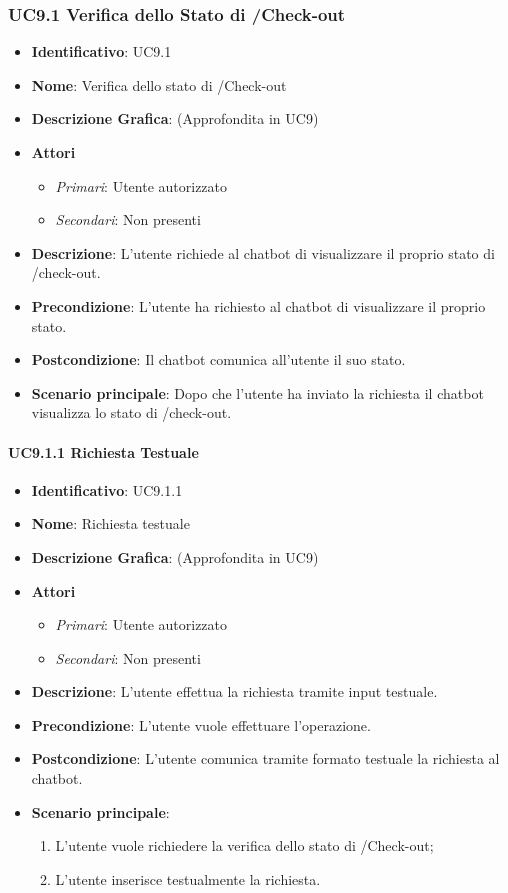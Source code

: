 \subsubsection{UC9.1 Verifica dello Stato di /Check-out}
\begin{itemize}
	\item \textbf{Identificativo}: UC9.1
	\item \textbf{Nome}: Verifica dello stato di /Check-out
	\item \textbf{Descrizione Grafica}: (Approfondita in UC9)
	\item \textbf{Attori}
	\begin{itemize}
		\item \textit{Primari}: Utente autorizzato
		\item \textit{Secondari}: Non presenti
	\end{itemize}
	\item \textbf{Descrizione}: L'utente richiede al chatbot di visualizzare il proprio stato di /check-out.
	\item \textbf{Precondizione}: L'utente ha richiesto al chatbot di visualizzare il proprio stato.
	\item \textbf{Postcondizione}: Il chatbot comunica all'utente il suo stato.
	\item \textbf{Scenario principale}: Dopo che l'utente ha inviato la richiesta il chatbot visualizza lo stato di /check-out.
\end{itemize}

\paragraph{UC9.1.1 Richiesta Testuale}
\begin{itemize}
	\item \textbf{Identificativo}: UC9.1.1
	\item \textbf{Nome}: Richiesta testuale
	\item \textbf{Descrizione Grafica}: (Approfondita in UC9)
	\item \textbf{Attori}
	\begin{itemize}
		\item \textit{Primari}: Utente autorizzato
		\item \textit{Secondari}: Non presenti
	\end{itemize}
	\item \textbf{Descrizione}: L'utente effettua la richiesta tramite input testuale.
	\item \textbf{Precondizione}: L'utente vuole effettuare l'operazione.
	\item \textbf{Postcondizione}: L'utente comunica tramite formato testuale la richiesta al chatbot.
	\item \textbf{Scenario principale}: 
	\begin{enumerate}
		\item L'utente vuole richiedere la verifica dello stato di /Check-out;
		\item L'utente inserisce testualmente la richiesta.
	\end{enumerate}
\end{itemize}

